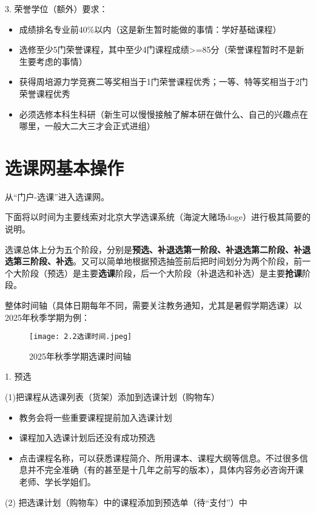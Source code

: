 \documentclass[11pt,oneside]{book}
\begin{document}
3. 荣誉学位（额外）要求：

\begin{itemize}
	\item 成绩排名专业前40\%以内（这是新生暂时能做的事情：学好基础课程）
	\item 选修至少5门荣誉课程，其中至少4门课程成绩>=85分（荣誉课程暂时不是新生要考虑的事情）
	\item 获得周培源力学竞赛二等奖相当于1门荣誉课程优秀；一等、特等奖相当于2门荣誉课程优秀
	\item 必须选修本科生科研（新生可以慢慢接触了解本研在做什么、自己的兴趣点在哪里，一般大二大三才会正式进组）
\end{itemize}

\newpage

\section{选课网基本操作}
从“门户-选课”进入选课网。

下面将以时间为主要线索对北京大学选课系统（海淀大赌场doge）进行极其简要的说明。

选课总体上分为五个阶段，分别是\textbf{\textbf{预选、补退选第一阶段、补退选第二阶段、补退选第三阶段、补选}}。又可以简单地根据预选抽签前后把时间划分为两个阶段，前一个大阶段（预选）是主要\textbf{\textbf{选课}}阶段，后一个大阶段（补退选和补选）是主要\textbf{\textbf{抢课}}阶段。

整体时间轴（具体日期每年不同，需要关注教务通知，尤其是暑假学期选课）以2025年秋季学期为例：
\begin{figure}[htbp]
	\centering
	\texttt{[image: 2.2选课时间.jpeg]}
	\renewcommand{\figurename}{图}
	\caption{2025年秋季学期选课时间轴}
	\label{fig:enter-label}
\end{figure}

1. 预选

(1)把课程从选课列表（货架）添加到选课计划（购物车）

\begin{itemize}
	\item  教务会将一些重要课程提前加入选课计划
	\item 课程加入选课计划后还没有成功预选
	\item 点击课程名称，可以获悉课程简介、所用课本、课程大纲等信息。不过很多信息并不完全准确（有的甚至是十几年之前写的版本），具体内容务必咨询开课老师、学长学姐们。
\end{itemize}

(2) 把选课计划（购物车）中的课程添加到预选单（待“支付”）中
\end{document}
